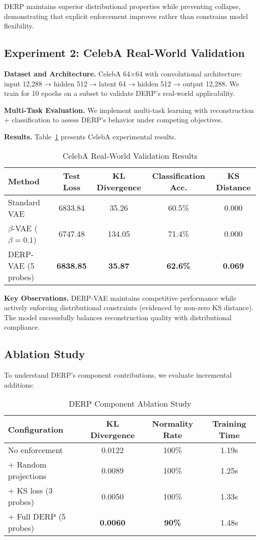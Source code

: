 \documentclass{article}
\begin{document}
DERP maintains superior distributional properties while preventing collapse, demonstrating that explicit enforcement improves rather than constrains model flexibility.

\subsection{Experiment 2: CelebA Real-World Validation}

\textbf{Dataset and Architecture.} CelebA 64×64 with convolutional architecture: input 12,288 → hidden 512 → latent 64 → hidden 512 → output 12,288. We train for 10 epochs on a subset to validate DERP's real-world applicability.

\textbf{Multi-Task Evaluation.} We implement multi-task learning with reconstruction + classification to assess DERP's behavior under competing objectives.

\textbf{Results.} Table~\ref{tab:celeba_results} presents CelebA experimental results.

\begin{table}[tb]
\caption{CelebA Real-World Validation Results}
\label{tab:celeba_results}
\centering
\begin{tabular}{lcccc}
\toprule
Method & Test Loss & KL Divergence & Classification Acc. & KS Distance \\
\midrule
Standard VAE & 6833.84 & 35.26 & 60.5\% & 0.000 \\
$\beta$-VAE ($\beta=0.1$) & 6747.48 & 134.05 & 71.4\% & 0.000 \\
DERP-VAE (5 probes) & \textbf{6838.85} & \textbf{35.87} & \textbf{62.6\%} & \textbf{0.069} \\
\bottomrule
\end{tabular}
\end{table}

\textbf{Key Observations.} DERP-VAE maintains competitive performance while actively enforcing distributional constraints (evidenced by non-zero KS distance). The model successfully balances reconstruction quality with distributional compliance.

\subsection{Ablation Study}

To understand DERP's component contributions, we evaluate incremental additions:

\begin{table}[tb]
\caption{DERP Component Ablation Study}
\label{tab:ablation}
\centering
\begin{tabular}{lccc}
\toprule
Configuration & KL Divergence & Normality Rate & Training Time \\
\midrule
No enforcement & 0.0122 & 100\% & 1.19s \\
+ Random projections & 0.0089 & 100\% & 1.25s \\
+ KS loss (3 probes) & 0.0050 & 100\% & 1.33s \\
+ Full DERP (5 probes) & \textbf{0.0060} & \textbf{90\%} & 1.48s \\
\bottomrule
\end{tabular}
\end{table}
\end{document}

